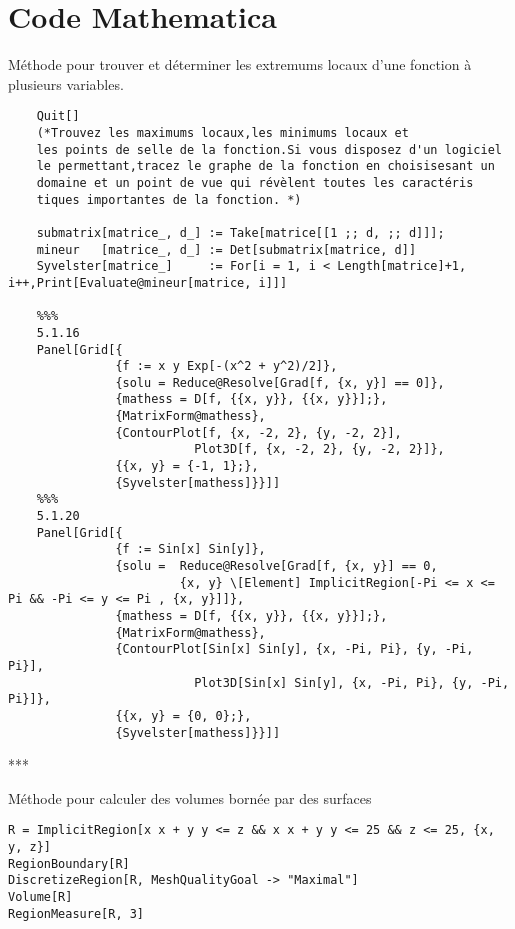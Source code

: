 \section{Code Mathematica}
	\begin{center}Méthode pour trouver et déterminer les extremums locaux d'une fonction à plusieurs variables.\end{center}
	\begin{verbatim}
	Quit[]
	(*Trouvez les maximums locaux,les minimums locaux et
	les points de selle de la fonction.Si vous disposez d'un logiciel
	le permettant,tracez le graphe de la fonction en choisisesant un 
	domaine et un point de vue qui révèlent toutes les caractéris­
	tiques importantes de la fonction. *)
	
	submatrix[matrice_, d_] := Take[matrice[[1 ;; d, ;; d]]];
	mineur   [matrice_, d_] := Det[submatrix[matrice, d]]	
	Syvelster[matrice_]     := For[i = 1, i < Length[matrice]+1, i++,Print[Evaluate@mineur[matrice, i]]]
	
	%%%
	5.1.16
	Panel[Grid[{
	           {f := x y Exp[-(x^2 + y^2)/2]},
	           {solu = Reduce@Resolve[Grad[f, {x, y}] == 0]},
	           {mathess = D[f, {{x, y}}, {{x, y}}];},
	           {MatrixForm@mathess},
	           {ContourPlot[f, {x, -2, 2}, {y, -2, 2}], 
	                      Plot3D[f, {x, -2, 2}, {y, -2, 2}]},
	           {{x, y} = {-1, 1};},
	           {Syvelster[mathess]}}]]
	%%%
	5.1.20
	Panel[Grid[{
	           {f := Sin[x] Sin[y]},
	           {solu =	Reduce@Resolve[Grad[f, {x, y}] == 0,
	           			{x, y} \[Element] ImplicitRegion[-Pi <= x <= Pi && -Pi <= y <= Pi , {x, y}]]},
	           {mathess = D[f, {{x, y}}, {{x, y}}];},
	           {MatrixForm@mathess},
	           {ContourPlot[Sin[x] Sin[y], {x, -Pi, Pi}, {y, -Pi, Pi}], 
	                      Plot3D[Sin[x] Sin[y], {x, -Pi, Pi}, {y, -Pi, Pi}]},
	           {{x, y} = {0, 0};},
	           {Syvelster[mathess]}}]]
	\end{verbatim}
	\begin{center}***\end{center}
\begin{center}Méthode pour calculer des volumes bornée par des surfaces \end{center}
		\begin{flushleft}
			\verb|R = ImplicitRegion[x x + y y <= z && x x + y y <= 25 && z <= 25, {x, y, z}]|\\
			\verb|RegionBoundary[R]|\\
			\verb|DiscretizeRegion[R, MeshQualityGoal -> "Maximal"]|\\
			\verb|Volume[R]|\\
			\verb|RegionMeasure[R, 3]|
		\end{flushleft}	